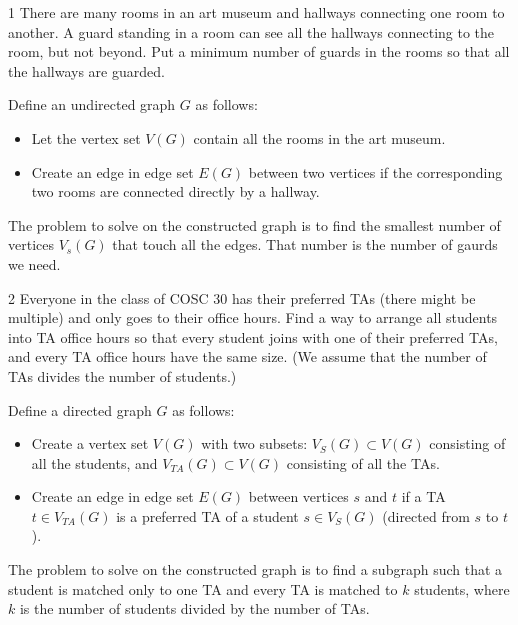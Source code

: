 \documentclass[12pt]{article}
\begin{document}


\begin{problem}{1}
    There are many rooms in an art museum and hallways connecting one room to another. A guard standing in a room can see all the hallways connecting to the room, but not beyond. Put a minimum number of guards in the rooms so that all the hallways are guarded.
\end{problem}

\begin{solution}
    \bbni

    Define an undirected graph $G$ as follows: 
    \begin{itemize}
        \item Let the vertex set $V(G)$ contain all the rooms in the art museum. 
        \item Create an edge in edge set $E(G)$ between two vertices if the corresponding two rooms are connected directly by a hallway. 
    \end{itemize}
    The problem to solve on the constructed graph is to find the smallest number of vertices $V_s(G)$ that touch all the edges. That number is the number of gaurds we need. 
\end{solution}
\bbni

\begin{problem}{2}
    Everyone in the class of COSC 30 has their preferred TAs (there might be multiple) and only goes to their office hours. Find a way to arrange all students into TA office hours so that every student joins with one of their preferred TAs, and every TA office hours have the same size. (We assume that the number of TAs divides the number of students.)
\end{problem}

\begin{solution}
    \bbni

    Define a directed graph $G$ as follows: 
    \begin{itemize}
        \item Create a vertex set $V(G)$ with two subsets: $V_S(G) \subset V(G)$ consisting of all the students, and $V_{TA}(G) \subset V(G)$ consisting of all the TAs. 
        \item Create an edge in edge set $E(G)$ between vertices $s$ and $t$ if a TA $t\in V_{TA}(G)$ is a preferred TA of a student $s \in V_S(G)$ (directed from $s$ to $t$). 
    \end{itemize}
    The problem to solve on the constructed graph is to find a subgraph such that a student is matched only to one TA and every TA is matched to $k$ students, where $k$ is the number of students divided by the number of TAs.  
\end{solution}
\end{document}

